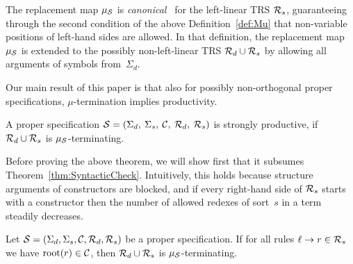 \documentclass{eptcs}
\begin{document}
The replacement map $\mu_{\mathcal{S}}$ is \emph{canonical}~\cite{L02} for the
left-linear TRS $\mathcal{R}_s$, guaranteeing through the second condition of the above
Definition~\ref{def:Mu} that non-variable positions of left-hand
sides are allowed.
In that definition, the replacement map $\mu_{\mathcal{S}}$ is extended to the
possibly non-left-linear TRS $\mathcal{R}_d \cup \mathcal{R}_s$ by allowing all arguments of
symbols from~$\Sigma_d$.


Our main result of this paper is that also for possibly non-orthogonal proper
specifications, $\mu$-termination implies productivity.

\begin{theorem}
\label{thm:CStermination}
A proper specification $\mathcal{S} = (\Sigma_d,\: \Sigma_s,\: \mathcal{C},\: \mathcal{R}_d,\: \mathcal{R}_s)$ is
strongly productive, if $\mathcal{R}_d \cup \mathcal{R}_s$ is $\mu_{\mathcal{S}}$-terminating.
\end{theorem}

Before proving the above theorem, we will show first that it subsumes
Theorem~\ref{thm:SyntacticCheck}. Intuitively, this holds because structure
arguments of constructors are blocked, and if every right-hand side of $\mathcal{R}_s$
starts with a constructor then the number of allowed redexes of sort~$s$ in a
term steadily decreases.

\begin{proposition}
\label{prop:CSimpliesSyn}
Let $\mathcal{S} = (\Sigma_d, \Sigma_s, \mathcal{C}, \mathcal{R}_d, \mathcal{R}_s)$ be a proper specification.
If for all rules $\ell \to r \in \mathcal{R}_s$ we have $\mathrm{root}(r) \in \mathcal{C}$, then
$\mathcal{R}_d \cup \mathcal{R}_s$ is $\mu_{\mathcal{S}}$-terminating.
\end{proposition}
\end{document}
